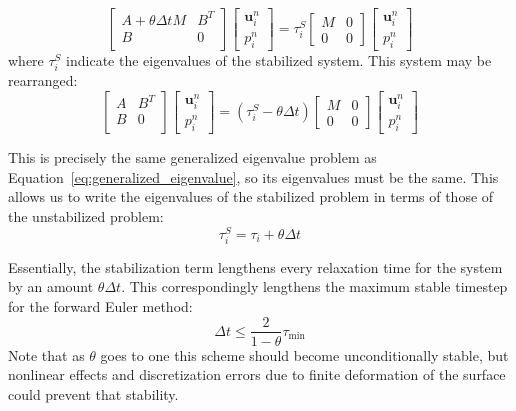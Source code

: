\documentclass[preprint,12pt,authoryear]{elsarticle}
\begin{document}
\begin{equation}
\begin{bmatrix}
A + \theta \Delta t M & B^T \\
B & 0 \\
\end{bmatrix}
\begin{bmatrix}
\mathbf{u}^n_i \\
p^n_i
\end{bmatrix}
=
\tau^S_i
\begin{bmatrix}
M & 0 \\
0 & 0
\end{bmatrix}
\begin{bmatrix}
\mathbf{u}^n_i \\
p^n_i
\end{bmatrix}
\label{eq:stabilized_generalized_eigenvalue}
\end{equation}
where $\tau^S_i$ indicate the eigenvalues of the stabilized system.
This system may be rearranged:
\begin{equation}
\begin{bmatrix}
A & B^T \\
B & 0 \\
\end{bmatrix}
\begin{bmatrix}
\mathbf{u}^n_i \\
p^n_i
\end{bmatrix}
=
\left(\tau^S_i - \theta \Delta t \right)
\begin{bmatrix}
M & 0 \\
0 & 0
\end{bmatrix}
\begin{bmatrix}
\mathbf{u}^n_i \\
p^n_i
\end{bmatrix}
\label{eq:rearranged_stabilized_generalized_eigenvalue}
\end{equation}

This is precisely the same generalized eigenvalue problem as Equation~\eqref{eq:generalized_eigenvalue},
so its eigenvalues must be the same.  This allows us to write the eigenvalues of the stabilized problem in
terms of those of the unstabilized problem:
\begin{equation}
\tau^S_i = \tau_i + \theta \Delta t
\end{equation}

Essentially, the stabilization term lengthens every relaxation time for the system by an amount $\theta \Delta t$.
This correspondingly lengthens the maximum stable timestep for the forward Euler method:
\begin{equation}
\Delta t  \le \frac{2}{1-\theta} \tau_{\mathrm{min}}
\label{eq:cfl_euler_stabilized}
\end{equation}
Note that as $\theta$ goes to one this scheme should become unconditionally stable,
but nonlinear effects and discretization errors due to finite deformation of the surface could 
prevent that stability.
\end{document}
